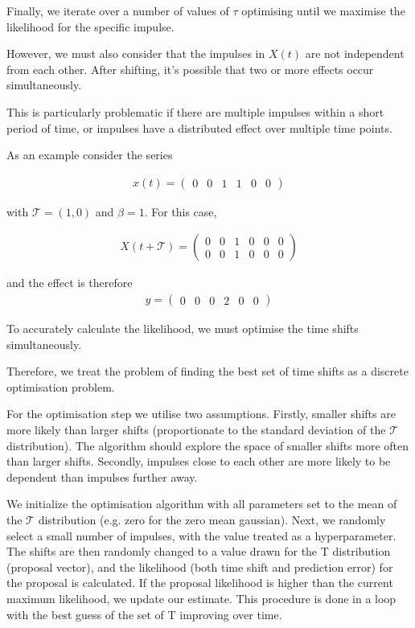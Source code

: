 \documentclass[11pt]{amsart}
\begin{document}
Finally, we iterate over a number of values of $\tau$ optimising until we maximise the likelihood for the specific impulse.

However, we must also consider that the impulses in $X(t)$ are not independent from each other. After shifting, it's possible that two or more effects occur simultaneously.

This is particularly problematic if there are multiple impulses within a short period of time, or impulses have a distributed effect over multiple time points. 

As an example consider the series 

\begin{align}
x(t) = 
\left(
\begin{array}{cccccc}
0 & 0 & 1 & 1 & 0 & 0
\end{array}  
\right)
\end{align}

with $\mathcal{T}= (1, 0)$ and $\beta = 1$. For this case, 

\begin{align}
X(t + \mathcal{T}) = 
\left(
\begin{array}{cccccc}
0 & 0 & 1 & 0 & 0 & 0 \\
0 & 0 & 1 & 0 & 0 & 0 
\end{array}  
\right)
\end{align}

and the effect is therefore 
\begin{align}
y = 
\left(
\begin{array}{cccccc}
0 & 0 & 0 & 2 & 0 & 0
\end{array}  
\right)
\end{align}

To accurately calculate the likelihood, we must optimise the time shifts simultaneously.

Therefore, we treat the problem of finding the best set of time shifts as a discrete optimisation problem.

For the optimisation step we utilise two assumptions. Firstly, smaller shifts are more likely than larger shifts (proportionate to the standard deviation of the $\mathcal{T}$ distribution). The algorithm should explore the space of smaller shifts more often than larger shifts. Secondly, impulses close to each other are more likely to be dependent than impulses further away. 

We initialize the optimisation algorithm with all parameters set to the mean of the $\mathcal{T}$ distribution (e.g. zero for the zero mean gaussian). Next, we randomly select a small number of impulses, with the value treated as a hyperparameter. The shifts are then randomly changed to a value drawn for the T distribution (proposal vector), and the likelihood (both time shift and prediction error) for the proposal is calculated. If the proposal likelihood is higher than the current maximum likelihood, we update our estimate. This procedure is done in a loop with the best guess of the set of T improving over time.
\end{document}
